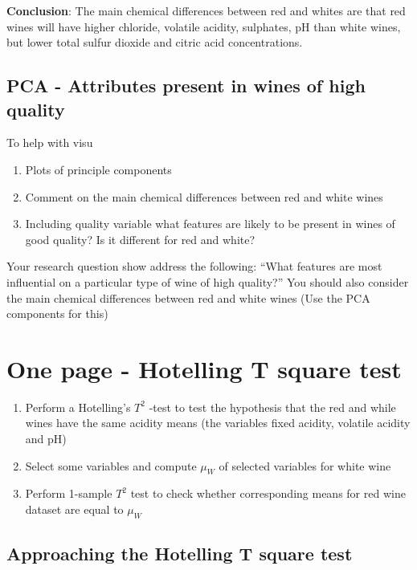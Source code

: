 \documentclass[
]{article}
\providecommand{\tightlist}{%
  \setlength{\itemsep}{0pt}\setlength{\parskip}{0pt}}
\begin{document}
\textbf{Conclusion}: The main chemical differences between red and
whites are that red wines will have higher chloride, volatile acidity,
sulphates, pH than white wines, but lower total sulfur dioxide and
citric acid concentrations.

\subsection{PCA - Attributes present in wines of high
quality}\label{pca---attributes-present-in-wines-of-high-quality}

To help with visu

\begin{enumerate}
\def\labelenumi{\arabic{enumi}.}
\tightlist
\item
  Plots of principle components
\item
  Comment on the main chemical differences between red and white wines
\item
  Including quality variable what features are likely to be present in
  wines of good quality? Is it different for red and white?
\end{enumerate}

Your research question show address the following: ``What features are
most influential on a particular type of wine of high quality?'' You
should also consider the main chemical differences between red and white
wines (Use the PCA components for this)

\section{One page - Hotelling T square
test}\label{one-page---hotelling-t-square-test}

\begin{enumerate}
\def\labelenumi{\arabic{enumi}.}
\tightlist
\item
  Perform a Hotelling's \(T^2\) -test to test the hypothesis that the
  red and while wines have the same acidity means (the variables fixed
  acidity, volatile acidity and pH)
\item
  Select some variables and compute \(\mu_W\) of selected variables for
  white wine
\item
  Perform 1-sample \(T^2\) test to check whether corresponding means for
  red wine dataset are equal to \(\mu_W\)
\end{enumerate}

\subsection{Approaching the Hotelling T square
test}\label{approaching-the-hotelling-t-square-test}
\end{document}
